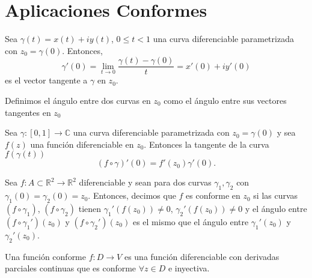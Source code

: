 \section{Aplicaciones Conformes}

\begin{defn}
  Sea $\gamma(t) = x(t) + i y(t)$, $0 \leq t < 1$ una curva diferenciable parametrizada con $z_{0} = \gamma(0)$. Entonces, 
  \[ 
    \gamma'(0) = \lim_{t \to 0} \frac{\gamma(t) - \gamma(0)}{t} = x'(0) + i y'(0) 
  \] 
  es el vector tangente a $\gamma$ en $z_{0}$.
\end{defn}

\begin{defn}
  Definimos el ángulo entre dos curvas en $z_{0}$ como el ángulo entre sus vectores tangentes en $z_{0}$
\end{defn}

\begin{theo}
  Sea $\gamma: [0,1] \to \mathbb{C}$ una curva diferenciable parametrizada con $z_{0} = \gamma(0)$ y sea $f(z)$ una función diferenciable en $z_{0}$. Entonces la tangente de la curva $f(\gamma(t))$
  \[ 
    (f \circ \gamma)'(0) = f'(z_{0}) \gamma'(0).
  \] 
\end{theo}

\begin{defn}
  Sea $f: A \subset \mathbb{R}^{2} \to \mathbb{R}^{2}$ diferenciable y sean para dos curvas $\gamma_{1}, \gamma_{2}$ con $\gamma_{1}(0) = \gamma_{2}(0) = z_{0}$. Entonces, decimos que $f$ es conforme en $z_{0}$ si las curvas $(f \circ \gamma_{1})$, $(f \circ \gamma_{2})$ tienen $\gamma_{1}'(f(z_{0})) \neq 0$, $\gamma_{2}'(f(z_{0})) \neq 0$ y el ángulo entre $(f \circ \gamma_{1}' )(z_{0})$ y $(f \circ \gamma_{2}')(z_{0})$ es el mismo que el ángulo entre $\gamma_{1}'(z_{0})$ y $\gamma_{2}'(z_{0})$.
\end{defn}

\begin{obs}
  Una función conforme $f: D \to V$ es una función diferenciable con derivadas parciales continuas que es conforme $\forall z \in D$ e inyectiva.
\end{obs}
